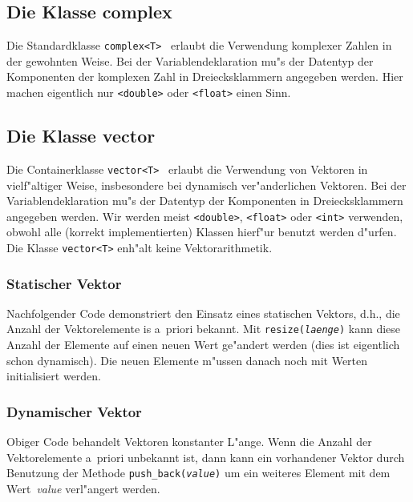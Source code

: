 \subsection{Die Klasse complex}
\label{p:2.3.2}
Die Standardklasse \texttt{complex<T>}~\cite[p.~677]{KirchPrinz:2002:OOP}
erlaubt die Verwendung komplexer Zahlen  in der gewohnten Weise.
Bei der Variablendeklaration mu"s der Datentyp der Komponenten der komplexen Zahl in
Dreiecksklammern angegeben werden. Hier machen eigentlich nur \verb|<double>| oder
\verb|<float>| einen Sinn.
%
%

\subsection{Die Klasse vector}
\label{p:2.3.4}
Die Containerklasse \texttt{vector<T>}~\cite[\S~5.1]{KuhlinsSchader:2002:DCS}
erlaubt die Verwendung von Vektoren  in vielf"altiger Weise, insbesondere
bei dynamisch ver"anderlichen Vektoren.
Bei der Variablendeklaration mu"s der Datentyp der Komponenten in
Dreiecksklammern angegeben werden. Wir werden meist \verb|<double>|,
\verb|<float>| oder \verb|<int>| verwenden, obwohl alle (korrekt implementierten) Klassen
hierf"ur benutzt werden d"urfen.
Die Klasse  \texttt{vector<T>} enh"alt keine Vektorarithmetik.
%
\subsubsection{Statischer Vektor}
Nachfolgender Code demonstriert den Einsatz eines statischen Vektors, d.h.,
die Anzahl der Vektorelemente is a~priori bekannt.
Mit \texttt{resize(\emph{laenge})} kann diese Anzahl der Elemente auf einen neuen Wert
ge"andert werden (dies ist eigentlich schon dynamisch). Die neuen Elemente m"ussen danach noch
mit Werten initialisiert werden.
%
%

\subsubsection{Dynamischer Vektor}
Obiger Code behandelt Vektoren konstanter L"ange. Wenn die Anzahl der Vektorelemente a~priori unbekannt ist,
dann kann ein vorhandener Vektor durch Benutzung der Methode \texttt{push\_back(\emph{value})} um ein
weiteres Element mit dem Wert~\emph{value} verl"angert werden.
%
%

